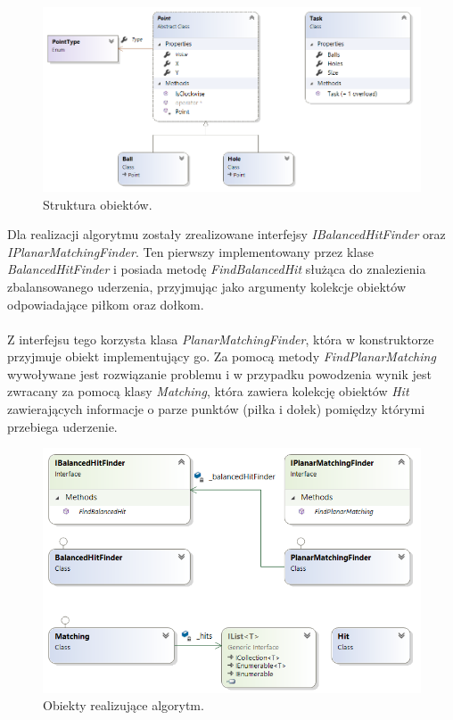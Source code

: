 \documentclass[10pt,a4paper]{article}
\begin{document}
	\begin{figure}[H]
		\centering	
 			\includegraphics[scale=0.5]{images/structure_diagram.png}
 			\caption{Struktura obiektów.}
 		\label{fig:structure_diagram}
	\end{figure}	

	Dla realizacji algorytmu zostały zrealizowane interfejsy \textit{IBalancedHitFinder} oraz \textit{IPlanarMatchingFinder}. Ten pierwszy implementowany przez klase \textit{BalancedHitFinder} i posiada metodę \textit{FindBalancedHit} służąca do znalezienia zbalansowanego uderzenia, przyjmując jako argumenty kolekcje obiektów odpowiadające piłkom oraz dołkom. \\~\\
	Z interfejsu tego korzysta klasa \textit{PlanarMatchingFinder}, która w konstruktorze przyjmuje obiekt implementujący go. Za pomocą metody \textit{FindPlanarMatching} wywoływane jest rozwiązanie problemu i w przypadku powodzenia wynik jest zwracany za pomocą klasy \textit{Matching}, która zawiera kolekcję obiektów \textit{Hit} zawierających informacje o parze punktów (piłka i dołek) pomiędzy którymi przebiega uderzenie.

	\begin{figure}[H]
		\centering
 			\includegraphics[scale=0.6]{images/algorithm_diagram.png}
 			\caption{Obiekty realizujące algorytm.}
 		\label{fig:algorithm_diagram}
	\end{figure}	
\end{document}
